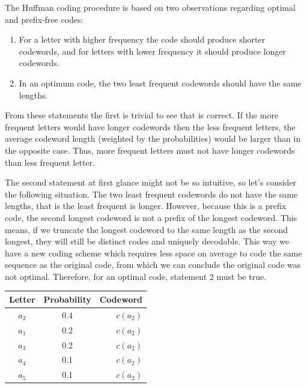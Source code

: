       The Huffman coding procedure is based on two observations regarding optimal and prefix-free codes:
      \begin{enumerate}
        \item For a letter with higher frequency the code should produce shorter codewords, and for letters with lower frequency it should produce longer codewords.
        \item In an optimum code, the two least frequent codewords should have the same lengths.
      \end{enumerate}

      From these statements the first is trivial to see that is correct. If the more frequent letters would have longer codewords then the less frequent letters, the average codeword length (weighted by the probabilities) would be larger than in the opposite case. Thus, more frequent letters must not have longer codewords than less frequent letter.

      The second statement at first glance might not be so intuitive, so let's consider the following situation. The two least frequent codewords do not have the same lengths, that is the least frequent is longer. However, because this is a prefix code, the second longest codeword is not a prefix of the longest codeword. This means, if we truncate the longest codeword to the same length as the second longest, they will still be distinct codes and uniquely decodable. This way we have a new coding scheme which requires less space on average to code the same sequence as the original code, from which we can conclude the original code was not optimal. Therefore, for an optimal code, statement 2 must be true.

      \begin{table}
        \centering
        \begin{tabular}{ccr}
          \toprule
          Letter & Probability & Codeword \\
          \midrule
          $a_2$ & 0.4 & $c(a_2)$ \\
          $a_1$ & 0.2 & $c(a_2)$ \\
          $a_3$ & 0.2 & $c(a_2)$ \\
          $a_4$ & 0.1 & $c(a_2)$ \\
          $a_5$ & 0.1 & $c(a_2)$ \\
          \bottomrule
        \end{tabular}
        \label{tab:huffman1}
      \end{table}

